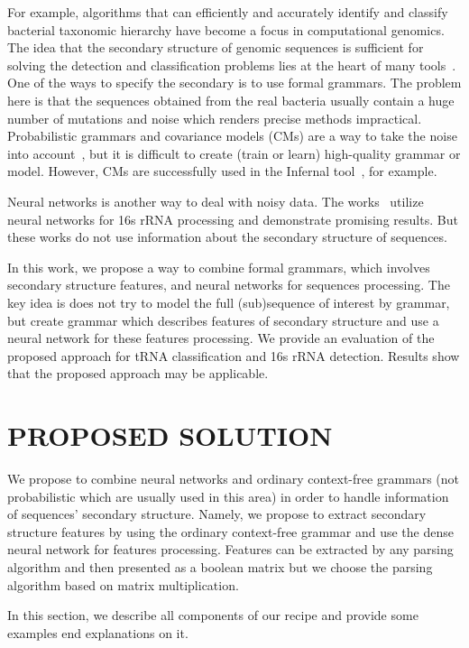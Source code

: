 \documentclass[a4paper,twoside]{article}
\begin{document}
For example, algorithms that can efficiently and accurately identify and classify bacterial taxonomic hierarchy have become a focus in computational genomics.
The idea that the secondary structure of genomic sequences is sufficient for solving the detection and classification problems lies at the heart of many tools~\cite{GrammarsRNA,PCFG,meta,LWPCFG}.
One of the ways to specify the secondary is to use formal grammars. 
The problem here is that the sequences obtained from the real bacteria usually contain a huge number of mutations and noise which renders precise methods impractical. 
Probabilistic grammars and covariance models (CMs) are a way to take the noise into account~\cite{EddyDurbin}, but it is difficult to create (train or learn) high-quality grammar or model.
However, CMs are successfully used in the Infernal tool~\cite{Infernal}, for example.

Neural networks is another way to deal with noisy data. 
The works~\cite{Humidor,ANN} utilize neural networks for 16s rRNA processing and demonstrate promising results.
But these works do not use information about the secondary structure of sequences.

In this work, we propose a way to combine formal grammars, which involves secondary structure features, and neural networks for sequences processing.
The key idea is does not try to model the full (sub)sequence of interest by grammar, but create grammar which describes features of secondary structure and use a neural network for these features processing.
We provide an evaluation of the proposed approach for tRNA classification and 16s rRNA detection.
Results show that the proposed approach may be applicable.

\section{\uppercase{Proposed solution}}
\label{sec:proposedSolution}

\noindent We propose to combine neural networks and ordinary context-free grammars (not probabilistic which are usually used in this area) in order to handle information of sequences' secondary structure. 
Namely, we propose to extract secondary structure features by using the ordinary context-free grammar and use the dense neural network for features processing.
Features can be extracted by any parsing algorithm and then presented as a boolean matrix but we choose the parsing algorithm based on matrix multiplication.

In this section, we describe all components of our recipe and provide some examples end explanations on it.
 
\end{document}
